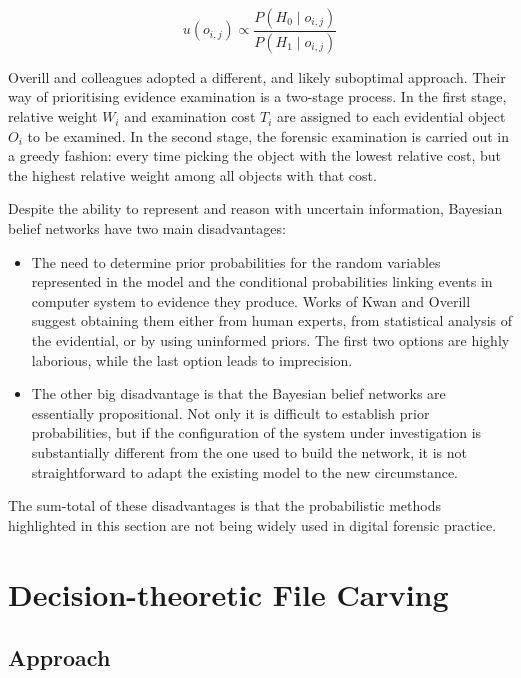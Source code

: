 \documentclass[10pt,a4paper]{article}
\begin{document}
\begin{equation}
u(o_{i,j} ) \propto \frac{P(H_0 \mid o_{i,j})}{P(H_1 \mid o_{i,j})}
\end{equation}

Overill and colleagues \cite{overill2009cost} adopted a different, and likely suboptimal approach. Their way of prioritising evidence examination is a two-stage process. In the first stage, relative weight $W_i$ and examination cost $T_i$ are assigned to each evidential object $O_i$  to be examined. In the second stage, the forensic examination is carried out in a greedy fashion: every time picking the object with the lowest relative cost, but the highest relative weight among all objects with that cost. 

Despite the ability to represent and reason with uncertain information, Bayesian belief networks have two main disadvantages:

\begin{itemize}

\item{The need to determine prior probabilities for the random variables represented in the model and the conditional probabilities linking events in computer system to evidence they produce.  Works of Kwan and Overill suggest obtaining them either from human experts, from statistical analysis of the evidential, or by using uninformed priors. The first two options are highly laborious, while the last option leads to imprecision.}

\item{The other big disadvantage is that the Bayesian belief networks are essentially propositional.  Not only it is difficult to establish prior probabilities, but if the configuration of the system under investigation is substantially different from the one used to build the network, it is not straightforward to adapt the existing model to the new circumstance.}

\end{itemize}

The sum-total of these disadvantages is that the probabilistic methods highlighted in this section are not being widely used in digital forensic practice. 


\section{Decision-theoretic File Carving}

\subsection{Approach}
\end{document}
